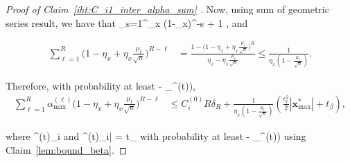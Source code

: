 \documentclass{article}
\def\[#1\]{{$#1$}}
\def\b#1{{\mathbf{#1}}}
\begin{document}
\begin{proof}[Proof of Claim~\ref{iht:C_i1_inter_alpha_sum} ]
	Now, using sum of geometric series result, we have that \[	\textstyle\sum\limits_{s=1}^{\ell}\eta_x (1-\eta_x)^{\ell-s + 1} \], and









	\begin{align*}
	
	
\textstyle\sum\limits_{\ell = 1}^{{R}} \big(1-\eta_x + \eta_x\tfrac{\mu_t}{\sqrt{n}} \big)^{{R} -\ell}& = \tfrac{1 - \big(1-\eta_x + \eta_x\tfrac{\mu_t}{\sqrt{n}} \big)^{{R}}}{\eta_x - \eta_x\tfrac{\mu_t}{\sqrt{n}}} \leq \tfrac{1}{\eta_x( 1- \tfrac{\mu_t}{\sqrt{n}})}.
	\end{align*}
	
	
	
	
	
	
	
	
	Therefore, with probability at least \[(1 - \delta_{\beta}^{(t)})\],
	\begin{align*}
	\textstyle\sum\limits_{\ell = 1}^{{R}}  \alpha^{(\ell)}_{\max}\big(1-\eta_x + \eta_x\tfrac{\mu_t}{\sqrt{n}} \big)^{{R} -\ell} 
	
	&\leq C_i^{(0)}{R}\delta_{R}  + \tfrac{1}{\eta_x( 1- \tfrac{\mu_t}{\sqrt{n}})}(\tfrac{\epsilon_t^2}{2} |\b{x}_{\max}^*| +t_\beta),
	\end{align*}
	
	where \[\lambda^{(t)}_{i} \leq {}\] and \[|\beta^{(t)}_i| = t_\beta\] with probability at least \[(1 - \delta_{\beta}^{(t)})\] using Claim~\ref{lem:bound_beta}.
	
\end{proof}
\end{document}
